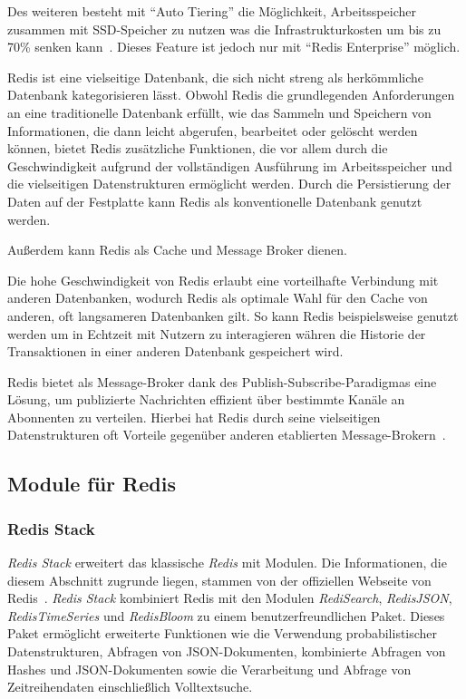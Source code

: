 Des weiteren besteht mit \enquote{Auto Tiering} die Möglichkeit, Arbeitsspeicher zusammen mit SSD-Speicher zu nutzen was die Infrastrukturkosten um bis zu 70\% senken kann~\cite{redis_ltd_auto_nodate}. Dieses Feature ist jedoch nur mit \enquote{Redis Enterprise} möglich.



Redis ist eine vielseitige Datenbank, die sich nicht streng als herkömmliche Datenbank kategorisieren lässt. Obwohl Redis die grundlegenden Anforderungen an eine traditionelle Datenbank erfüllt, wie das Sammeln und Speichern von Informationen, die dann leicht abgerufen, bearbeitet oder gelöscht werden können, bietet Redis zusätzliche Funktionen, die vor allem durch die Geschwindigkeit aufgrund der vollständigen Ausführung im Arbeitsspeicher und die vielseitigen Datenstrukturen ermöglicht werden.
Durch die Persistierung der Daten auf der Festplatte kann Redis als konventionelle Datenbank genutzt werden.

Außerdem kann Redis als Cache und Message Broker dienen.

Die hohe Geschwindigkeit von Redis erlaubt eine vorteilhafte Verbindung mit anderen Datenbanken, wodurch Redis als optimale Wahl für den Cache von anderen, oft langsameren Datenbanken gilt. So kann Redis beispielsweise genutzt werden um in Echtzeit mit Nutzern zu interagieren währen die Historie der Transaktionen in einer anderen Datenbank gespeichert wird.

Redis bietet als Message-Broker dank des Publish-Subscribe-Paradigmas eine Lösung, um publizierte Nachrichten effizient über bestimmte Kanäle an Abonnenten zu verteilen. Hierbei hat Redis durch seine vielseitigen Datenstrukturen oft Vorteile gegenüber anderen etablierten Message-Brokern~\cite{joshi_you_nodate}.

\subsection{Module für Redis}
\subsubsection{Redis Stack}
\emph{Redis Stack} erweitert das klassische \emph{Redis} mit Modulen.
Die Informationen, die diesem Abschnitt zugrunde liegen, stammen von der offiziellen Webseite von Redis~\cite{redis_ltd_about_nodate}.
\emph{Redis Stack} kombiniert Redis mit den Modulen \emph{RediSearch}, \emph{RedisJSON}, \emph{RedisTimeSeries} und \emph{RedisBloom} zu einem benutzerfreundlichen Paket.
Dieses Paket ermöglicht erweiterte Funktionen wie die Verwendung probabilistischer Datenstrukturen, Abfragen von JSON-Dokumenten, kombinierte Abfragen von Hashes und JSON-Dokumenten sowie die Verarbeitung und Abfrage von Zeitreihendaten einschließlich Volltextsuche.

